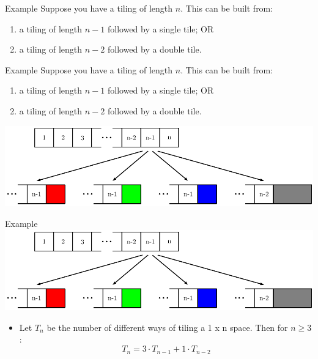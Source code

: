 \documentclass{beamer}
\begin{document}
\begin{frame}{Example}
    Suppose you have a tiling of length $n$. This can be built from:
    \begin{enumerate}
        \item a tiling of length $n-1$ followed by a single tile; OR
        \item a tiling of length $n-2$ followed by a double tile.    
    \end{enumerate}
\end{frame}

\begin{frame}{Example}
    Suppose you have a tiling of length $n$. This can be built from:
    \begin{enumerate}
        \item a tiling of length $n-1$ followed by a single tile; OR
        \item a tiling of length $n-2$ followed by a double tile.    
    \end{enumerate}
    \vspace{0.5cm}
    \centering
    \includegraphics[width=1\linewidth]{tiling1}    
\end{frame}

\begin{frame}{Example}
    \centering 
    \includegraphics[width=0.8\linewidth]{tiling1} 
    \begin{itemize}
        \item Let $T_n$ be the number of different ways of tiling a 1 x n space. Then for $n \geq 3$:
        \begin{equation}\tag{1}
            T_n = 3 \cdot T_{n-1} + 1 \cdot T_{n-2}
        \end{equation}
    \end{itemize}
\end{frame}
\end{document}
